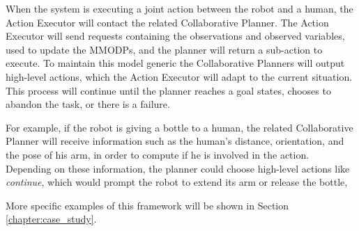 When the system is executing a joint action between the robot and a human, the Action Executor will contact the related Collaborative Planner.  The Action Executor will send requests containing the observations and observed variables, used to update the MMODPs, and the planner will return a sub-action to execute. To maintain this model generic the Collaborative Planners will output high-level actions, which the Action Executor will adapt to the current situation. This process will continue until the planner reaches a goal states, chooses to abandon the task, or there is a failure.

For example, if the robot is giving a bottle to a human, the related Collaborative Planner will receive information such as the human's distance, orientation, and the pose of his arm, in order to compute if he is involved in the action. Depending on these information, the planner could choose high-level actions like \textit{continue}, which would prompt the robot to extend its arm or release the bottle, 

More specific examples of this framework will be shown in Section \ref{chapter:case_study}.
